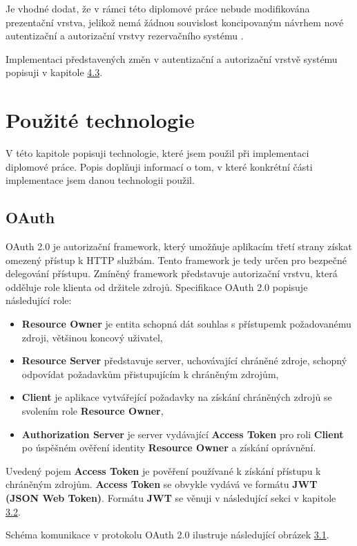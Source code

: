 \documentclass[
  printed, %
  twoside, %
  table,   %
  nolof,     %
  nolot,     %
]{fithesis3}
\begin{document}
\par 

Je vhodné dodat, že v rámci této diplomové práce nebude modifikována prezentační vrstva, jelikož nemá žádnou souvislost koncipovaným návrhem nové autentizační a autorizační vrstvy rezervačního systému .

\par

Implementaci představených změn v autentizační a autorizační vrstvě systému  popisuji v kapitole \hyperref[ShongoImpl]{4.3}.

\chapter{Použité technologie}
V této kapitole popisuji technologie, které jsem použil při implementaci diplomové práce. Popis doplňuji informací o tom, v které konkrétní části implementace jsem danou technologii použil.
\section{OAuth}
\label{sec:oauth}
OAuth 2.0 \cite{rfc6749} je autorizační framework, který umožňuje aplikacím třetí strany získat omezený přístup k HTTP službám. Tento framework je tedy určen pro bezpečné delegování přístupu. Zmíněný framework představuje autorizační vrstvu, která odděluje role klienta od držitele zdrojů. Specifikace OAuth 2.0 popisuje následující role: 
\begin{itemize}
    \item \textbf{Resource Owner} je entita schopná dát souhlas s přístupem\break k požadovanému zdroji, většinou koncový uživatel,
    \item \textbf{Resource Server} představuje server, uchovávající chráněné zdroje, schopný odpovídat požadavkům přistupujícím k chráněným zdrojům,
    \item \textbf{Client} je aplikace vytvářející požadavky na získání chráněných zdrojů se svolením role \textbf{Resource Owner},
    \item \textbf{Authorization Server} je server vydávající \textbf{Access Token} pro roli \textbf{Client} po úspěšném ověření identity \textbf{Resource Owner} a získání oprávnění.
\end{itemize}
Uvedený pojem \textbf{Access Token} je pověření používané k získání přístupu k chráněným zdrojům. \textbf{Access Token} se obvykle vydává ve formátu \textbf{JWT (JSON Web Token)}. Formátu \textbf{JWT} se věnuji v následující sekci v kapitole \hyperref[sec:oidc]{3.2}.  \par
\clearpage
Schéma komunikace v protokolu OAuth 2.0 ilustruje následující obrázek \hyperref[fig:oauth]{3.1}. 
\end{document}
